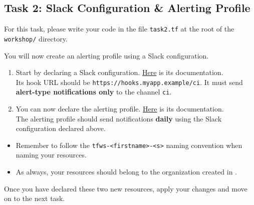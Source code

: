 \subsection{Task 2: Slack Configuration \& Alerting Profile}\label{sec:task2}

\begin{note}
For this task, please write your code in the file \texttt{task2.tf}
at the root of the \texttt{workshop/} directory.
\end{note}

You will now create an alerting profile using a Slack configuration.

\begin{enumerate}
  \item Start by declaring a Slack configuration.
  \href{https://registry.terraform.io/providers/itera-io/taikun/latest/docs/resources/slack_configuration}{Here} is its documentation.\\

Its hook URL should be \texttt{https://hooks.myapp.example/ci}.
It must send \textbf{alert-type notifications only} to the channel \texttt{ci}.
  \item You can now declare the alerting profile.
    \href{https://registry.terraform.io/providers/itera-io/taikun/latest/docs/resources/alerting_profile}{Here} is its documentation.\\
    The alerting profile should send notifications \textbf{daily} using the Slack configuration declared above.
\end{enumerate}

\begin{warn}
  \begin{itemize}
    \item Remember to follow the \texttt{tfws-<firstname>-<s>} naming convention when naming your resources.
    \item As always, your resources should belong to the organization created in .
  \end{itemize}
\end{warn}

Once you have declared these two new resources, apply your changes and move on to the next task.
